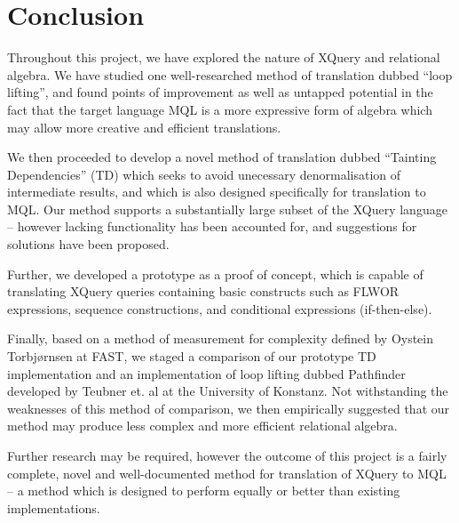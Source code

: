 \chapter{Conclusion}
\label{chapter:conclusion}
Throughout this project, we have explored the nature of XQuery and relational
algebra. We have studied one well-researched method of translation dubbed ``loop
lifting'', and found points of improvement as well as untapped potential in the
fact that the target language MQL is a more expressive form of algebra
which may allow more creative and efficient translations.

We then proceeded to develop a novel method of translation dubbed ``Tainting
Dependencies'' (TD) which seeks to avoid unecessary denormalisation of
intermediate results, and which is also designed specifically for translation
to MQL. Our method supports a substantially large subset of the XQuery language
-- however lacking functionality has been accounted for, and suggestions for
solutions have been proposed.

Further, we developed a prototype as a proof of concept, which is capable of
translating XQuery queries containing basic constructs such as FLWOR
expressions, sequence constructions, and conditional expressions (if-then-else).

Finally, based on a method of measurement for complexity defined by Oystein
Torbj\o rnsen at FAST, we staged a comparison of our prototype TD implementation
and an implementation of loop lifting dubbed Pathfinder developed by Teubner
et. al at the University of Konstanz. Not withstanding the weaknesses of this
method of comparison, we then empirically suggested that our method may
produce less complex and more efficient relational algebra.

Further research may be required, however the outcome of this project is a
fairly complete, novel and well-documented method for translation of XQuery to
MQL -- a method which is designed to perform equally or better than existing
implementations.

% 
